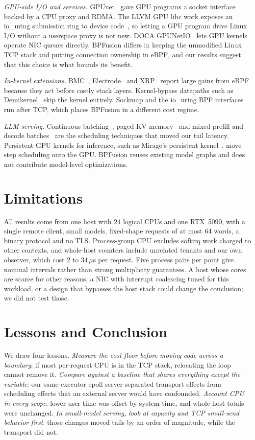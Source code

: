 \documentclass[sigconf,nonacm]{acmart}
\newcommand{\us}{\,$\mu$s}
\begin{document}
\emph{GPU-side I/O and services.} GPUnet~\cite{gpunet} gave GPU programs a
socket interface backed by a CPU proxy and RDMA. The LLVM GPU libc work exposes
an io\_uring submission ring to device code~\cite{llvmgpuio}, so letting a GPU
program drive Linux I/O without a userspace proxy is not new. DOCA
GPUNetIO~\cite{gpunetio} lets GPU kernels operate NIC queues directly. BPFusion
differs in keeping the unmodified Linux TCP stack and putting connection
ownership in eBPF, and our results suggest that this choice is what bounds its
benefit.

\emph{In-kernel extensions.} BMC~\cite{bmc}, Electrode~\cite{electrode} and
XRP~\cite{xrp} report large gains from eBPF because they act before costly
stack layers. Kernel-bypass datapaths such as Demikernel~\cite{demikernel} skip
the kernel entirely. Sockmap and the io\_uring BPF interfaces~\cite{iouring}
run after TCP, which places BPFusion in a different cost regime.

\emph{LLM serving.} Continuous batching~\cite{orca}, paged KV
memory~\cite{vllm} and mixed prefill and decode batches~\cite{sarathi} are the
scheduling techniques that moved our tail latency. Persistent GPU kernels for
inference, such as Mirage's persistent kernel~\cite{mpk}, move step scheduling
onto the GPU. BPFusion reuses existing model graphs and does not contribute
model-level optimizations.

\section{Limitations}

All results come from one host with 24 logical CPUs and one RTX~5090, with a
single remote client, small models, fixed-shape requests of at most 64 words, a
binary protocol and no TLS. Process-group CPU excludes softirq work charged to
other contexts, and whole-host counters include unrelated tenants and our own
observer, which cost 2 to 34\us{} per request. Five process pairs per point
give nominal intervals rather than strong multiplicity guarantees. A host
whose cores are scarce for other reasons, a NIC with interrupt coalescing
tuned for this workload, or a design that bypasses the host stack could change
the conclusion; we did not test those.

\section{Lessons and Conclusion}

We draw four lessons. \emph{Measure the cost floor before moving code across a
boundary}: if most per-request CPU is in the TCP stack, relocating the loop
cannot remove it. \emph{Compare against a baseline that shares everything except
the variable}: our same-executor epoll server separated transport effects from
scheduling effects that an external server would have confounded.
\emph{Account CPU in every scope}: lower user time was offset by system time,
and whole-host totals were unchanged. \emph{In small-model serving, look at
capacity and TCP small-send behavior first}: those changes moved tails by an
order of magnitude, while the transport did not.
\end{document}
